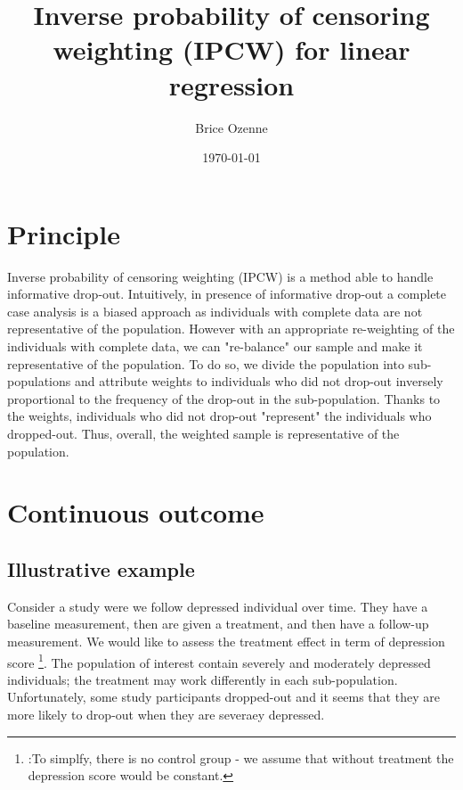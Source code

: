 \documentclass[12pt]{article}
\author{Brice Ozenne}
\date{\today}
\title{Inverse probability of censoring weighting (IPCW) for linear regression}
\begin{document}
\maketitle

\section{Principle}
\label{sec:orgfa612b9}

Inverse probability of censoring weighting (IPCW) is a method able to
handle informative drop-out. Intuitively, in presence of informative
drop-out a complete case analysis is a biased approach as individuals
with complete data are not representative of the population. However
with an appropriate re-weighting of the individuals with complete
data, we can "re-balance" our sample and make it representative of the
population. To do so, we divide the population into sub-populations
and attribute weights to individuals who did not drop-out inversely
proportional to the frequency of the drop-out in the
sub-population. Thanks to the weights, individuals who did not
drop-out "represent" the individuals who dropped-out. Thus, overall,
the weighted sample is representative of the population.

\section{Continuous outcome}
\label{sec:orgde7e51b}

\subsection{Illustrative example}
\label{sec:org04d3e09}

Consider a study were we follow depressed individual over time. They
have a baseline measurement, then are given a treatment, and then have
a follow-up measurement. We would like to assess the treatment effect
in term of depression score \footnote{:To simplfy, there is no control
group - we assume that without treatment the depression score would be
constant.}. The population of interest contain severely and moderately
depressed individuals; the treatment may work differently in each
sub-population. Unfortunately, some study participants dropped-out and
it seems that they are more likely to drop-out when they are severaey
depressed.

\clearpage
\end{document}
